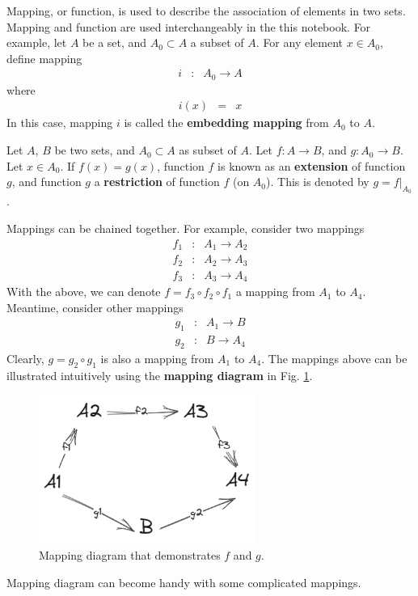 Mapping, or function, is used to describe the association of elements in two sets. Mapping and function are used interchangeably in the this notebook. For example, let $A$ be a set, and $A_0 \subset A$ a subset of $A$. For any element $x\in A_0$, define mapping
\begin{eqnarray}
  i &:& A_0 \rightarrow A \nonumber
\end{eqnarray}
where
\begin{eqnarray}
  i(x) &=& x \nonumber
\end{eqnarray}
In this case, mapping $i$ is called the \textbf{embedding mapping} from $A_0$ to $A$.

Let $A$, $B$ be two sets, and $A_0 \subset A$ as subset of $A$. Let $f: A\rightarrow B$, and $g: A_0\rightarrow B$. Let $x\in A_0$. If $f(x)=g(x)$, function $f$ is known as an \textbf{extension} of function $g$, and function $g$ a \textbf{restriction} of function $f$ (on $A_0$). This is denoted by $g=f|_{A_0}$.

Mappings can be chained together. For example, consider two mappings
\begin{eqnarray}
	f_1 &:& A_1 \rightarrow A_2 \nonumber \\
	f_2 &:& A_2 \rightarrow A_3 \nonumber \\
	f_3 &:& A_3 \rightarrow A_4 \nonumber
\end{eqnarray}
With the above, we can denote $f = f_3\circ f_2\circ f_1$ a mapping from $A_1$ to $A_4$. Meantime, consider other mappings
\begin{eqnarray}
	g_1 &:& A_1 \rightarrow B \nonumber \\
	g_2 &:& B \rightarrow A_4 \nonumber 
\end{eqnarray}
Clearly, $g = g_2\circ g_1$ is also a mapping from $A_1$ to $A_4$. The mappings above can be illustrated intuitively using the \textbf{mapping diagram} in Fig. \ref{fig:mapping_plot}.
\begin{figure}[htbp]
	\centering
	\includegraphics[width=200pt]{chapters/abstract-algebra-basics/figures/mapping_plot.png}
	\caption{Mapping diagram that demonstrates $f$ and $g$.} \label{fig:mapping_plot}
\end{figure}
Mapping diagram can become handy with some complicated mappings.

